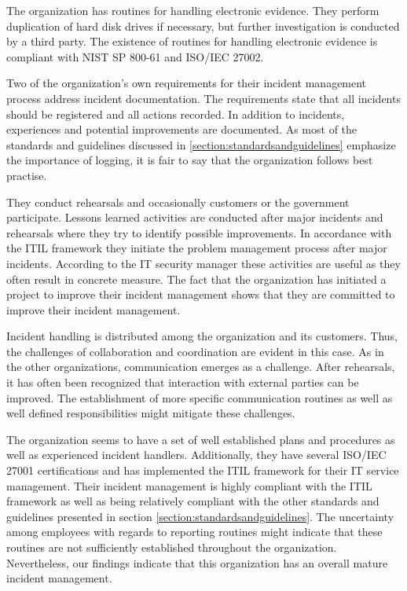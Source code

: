 The organization has routines for handling electronic evidence. They perform duplication of hard disk drives if necessary, but further investigation is conducted by a third party. The existence of routines for handling electronic evidence is compliant with NIST SP 800-61 and ISO/IEC 27002.

Two of the organization's own requirements for their incident management process address incident documentation. The requirements state that all incidents should be registered and all actions recorded. In addition to incidents, experiences and potential improvements are documented. As most of the standards and guidelines discussed in \ref{section:standardsandguidelines} emphasize the importance of logging, it is fair to say that the organization follows best practise.

They conduct rehearsals and occasionally customers or the government participate. Lessons learned activities are conducted after major incidents and rehearsals where they try to identify possible improvements. In accordance with the ITIL framework they initiate the problem management process after major incidents. According to the IT security manager these activities are useful as they often result in concrete measure. The fact that the organization has initiated a project to improve their incident management shows that they are committed to improve their incident management.

Incident handling is distributed among the organization and its customers. Thus, the challenges of collaboration and coordination are evident in this case. As in the other organizations, communication emerges as a challenge. After rehearsals, it has often been recognized that interaction with external parties can be improved. The establishment of more specific communication routines as well as well defined responsibilities might mitigate these challenges.

The organization seems to have a set of well established plans and procedures as well as experienced incident handlers. Additionally, they have several ISO/IEC 27001 certifications and has implemented the ITIL framework for their IT service management. Their incident management is highly compliant with the ITIL framework as well as being relatively compliant with the other standards and guidelines presented in section \ref{section:standardsandguidelines}. The uncertainty among employees with regards to reporting routines might indicate that these routines are not sufficiently established throughout the organization. Nevertheless, our findings indicate that this organization has an overall mature incident management. 

